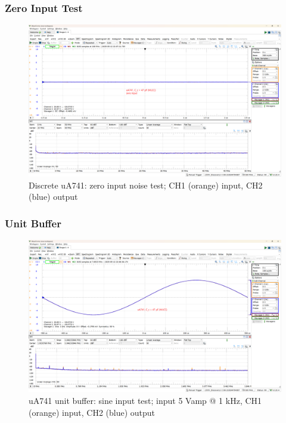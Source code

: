 \documentclass[UTF8]{article}
\begin{document}
\subsubsection{Zero Input Test}
\vspace*{-3.5mm}
\begin{figure}[H]\centering
    \includegraphics[width=\columnwidth]{LCE-06-07-运放设计/assets/uA741/test/zero input.png}\vspace*{-2mm}
    \caption{Discrete uA741: zero input noise test; CH1 (orange) input, CH2 (blue) output}
\end{figure}
\vspace*{-2mm}
\subsubsection{Unit Buffer}
\vspace*{-3.5mm}
\begin{figure}[H]\centering
    \includegraphics[width=\columnwidth]{LCE-06-07-运放设计/assets/uA741/test/unit buffer 1.png}\vspace*{-2mm}
    \caption{uA741 unit buffer: sine input test; input 5 Vamp @ 1 kHz, CH1 (orange) input, CH2 (blue) output}
\end{figure}
\end{document}
